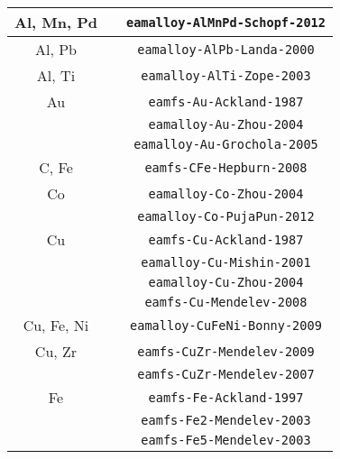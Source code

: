 \begin{table}
{\begin{center}
\begin{tabular}{ccc}
        Al, Mn, Pd & \cite{schopf2012embedded} & \verb+eamalloy-AlMnPd-Schopf-2012+\\\hline
        Al, Pb & \cite{landa2000development} & \verb+eamalloy-AlPb-Landa-2000+\\\hline
        Al, Ti & \cite{zope2003interatomic} & \verb+eamalloy-AlTi-Zope-2003+\\\hline
        Au & \cite{ackland1987simple} & \verb+eamfs-Au-Ackland-1987+\\
        & \cite{zhou2004misfit} & \verb+eamalloy-Au-Zhou-2004+\\
        & \cite{grochola2005fitting} & \verb+eamalloy-Au-Grochola-2005+\\\hline
        C, Fe  & \cite{hepburn2008metallic} & \verb+eamfs-CFe-Hepburn-2008+\\\hline
        Co & \cite{zhou2004misfit} & \verb+eamalloy-Co-Zhou-2004+\\
        & \cite{pun2012embedded} & \verb+eamalloy-Co-PujaPun-2012+\\\hline
        Cu & \cite{ackland1987simple} & \verb+eamfs-Cu-Ackland-1987+\\
        & \cite{mishin2001structural} & \verb+eamalloy-Cu-Mishin-2001+\\
        & \cite{zhou2004misfit} & \verb+eamalloy-Cu-Zhou-2004+\\
        & \cite{mendelev2008analysis} & \verb+eamfs-Cu-Mendelev-2008+\\\hline
        Cu, Fe, Ni & \cite{bonny2009ternary} & \verb+eamalloy-CuFeNi-Bonny-2009+\\\hline
        Cu, Zr & \cite{mendelev2009developmentcuzr} & \verb+eamfs-CuZr-Mendelev-2009+\\
        & \cite{mendelev2007using} & \verb+eamfs-CuZr-Mendelev-2007+\\\hline
        Fe  & \cite{ackland1997computer} & \verb+eamfs-Fe-Ackland-1997+\\
        & \cite{mendelev2003development} & \verb+eamfs-Fe2-Mendelev-2003+\\
        & \cite{mendelev2003development} & \verb+eamfs-Fe5-Mendelev-2003+\\

\end{tabular}
\end{center}}
\end{table}
